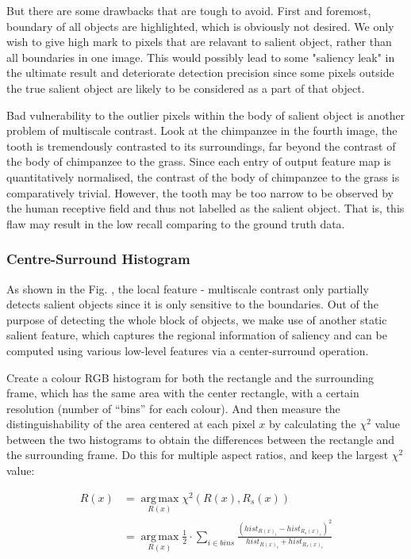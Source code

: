 \documentclass[10pt,twocolumn,letterpaper]{article}
\DeclareMathOperator*{\argmax}{arg\,max}
\newcommand{\SUM}{\sum\limits}
\begin{document}
But there are some drawbacks that are tough to avoid. First and foremost, boundary of all objects are highlighted, which is obviously not desired. We only wish to give high mark to pixels that are relavant to salient object, rather than all boundaries in one image. This would possibly lead to some "saliency leak" in the ultimate result and deteriorate detection precision since some pixels outside the true salient object are likely to be considered as a part of that object.

Bad vulnerability to the outlier pixels within the body of salient object is another problem of multiscale contrast. Look at the chimpanzee in the fourth image, the tooth is tremendously contrasted to its surroundings, far beyond the contrast of the body of chimpanzee to the grass. Since each entry of output feature map is quantitatively normalised, the contrast of the body of chimpanzee to the grass is comparatively trivial. However, the tooth may be too narrow to be observed by the human receptive field and thus not labelled as the salient object. That is, this flaw may result in the low recall comparing to the ground truth data.

\subsubsection{Centre-Surround Histogram}

As shown in the Fig. , the local feature - multiscale contrast only partially detects salient objects since it is only sensitive to the boundaries. Out of the purpose of detecting the whole block of objects, we make use of another static salient feature, which captures the regional information of saliency and can be computed using various low-level features via a center-surround operation. 

Create a colour RGB histogram for both the rectangle and the surrounding frame, which has the same area with the center rectangle, with a certain resolution (number of ``bins'' for each colour). And then measure the distinguishability of the area centered at each pixel $x$ by calculating the $\chi^2$ value between the two histograms to obtain the differences between the rectangle and the surrounding frame.  Do this for multiple aspect ratios, and keep the largest $\chi^2$ value: 

\begin{align*}
R(x) &= \argmax\limits_{R(x)}\chi^2(R(x), R_s(x)) \\ &=\argmax\limits_{R(x)}\frac{1}{2}\cdot\SUM_{i\in bins}\frac{(hist_{R(x)_i}-hist_{R_s(x)_i})^2}{hist_{R(x)_i}+hist_{R_s(x)_i}}
\end{align*}
\end{document}
